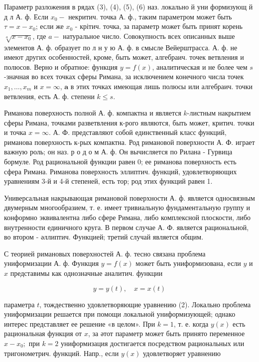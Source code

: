 \documentclass[10pt]{article}
\begin{document}
Параметр разложения в рядах (3), (4), (5), (6) наз. локально й уни формизующ й д л А. ф. Если $x_{0}-$ некритич. точка А. ф., таким параметром может быть $\tau=x-x_{0}$; если же $x_{0}$ - крітич. точка, за параметр может быть принят корень $\sqrt[a]{x-x_{0}}$, где $a-$ натуральное число. Совокупность всех описанных выше элементов А. ф. образует по л н у ю А. ф. в смысле Вейерштрасса. А. ф. не имеют других особенностей, кроме, быть может, алгебраич. точек ветвления и полюсов. Верно и обратное: функция $y=f(x)$, аналитическая и не более чем $s$-значная во всех точках сферы Римана, за исключением конечного числа точек $x_{1}, \ldots, x_{m}$ и $x=\infty$, $\mathbf{a}$ в этих точках имеющая лишь полюсы или алгебраич. точки ветвления, есть А. ф. степени $k \leqslant s$.



Риманова поверхность полной А. ф. компактна и является $k$-листным накрытием сферы Римана, точками разветвления к-рого являются, быть может, критич. точки и точка $x=\infty$. А. Ф. представляют собой единственный класс функций, риманова поверхность к-рых компактна. Род римановой поверхности А. Ф. играет важную роль; он наз. р о д о м А. ф. Он вычисляется по Рилана - Гурвица бормуле. Род рациональной функции равен 0; ее риманова поверхность есть сфера Римана. Риманова поверхность эллиптич. функций, удовлетворяющих уравнениям 3-й и 4-й степеней, есть тор; род этих функций равен 1.



Универсальная накрывающая римановой поверхности А. ф. является односвязным двумерным многообразием, т. е. имеет тривиальную фундаментальную группу и конформно эквивалентна либо сфере Римана, либо комплексной плоскости, либо внутренности единичного круга. В первом случае А. Ф. является рациональной, во втором - әллиптич. Функцией; третий случай является общим.



С теорией римановых поверхностей А. ф. тесно связана проблема униформизации А. ф. Функция $y=f(x)$ может быть униформизована, если $y$ и $x$ представимы как однозначные аналитич. функции



\[

y=y(t), \quad x=x(t)

\]



параметра $t$, тождественно удовлетворяющие уравнению (2). Локально проблема униформизации решается при помощи локальной униформизующей; однако интерес представляет ее решение «в целом». При $k=1$, т. е. когда $y(x)$ есть рациональная функция от $x$, за әтот параметр может быть принято переменное $x-x_{0} ;$ при $k=2$ униформизация достигается посредством рациональных или тригонометрич. функций. Напр., если $y(x)$ удовлетворяет уравнению
\end{document}
